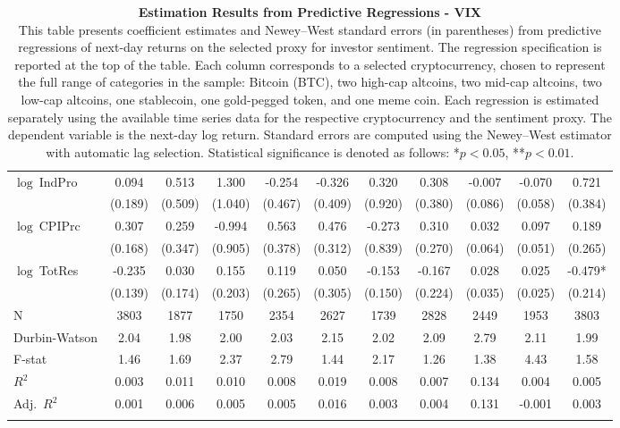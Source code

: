 \begin{table}[ht]
\begin{tabular}{l *{10}{c}}
\addlinespace
$\log\ $IndPro & 0.094 & 0.513 & 1.300 & -0.254 & -0.326 & 0.320 & 0.308 & -0.007 & -0.070 & 0.721 \\
 & (0.189) & (0.509) & (1.040) & (0.467) & (0.409) & (0.920) & (0.380) & (0.086) & (0.058) & (0.384) \\
\addlinespace
$\log\ $CPIPrc & 0.307 & 0.259 & -0.994 & 0.563 & 0.476 & -0.273 & 0.310 & 0.032 & 0.097 & 0.189 \\
 & (0.168) & (0.347) & (0.905) & (0.378) & (0.312) & (0.839) & (0.270) & (0.064) & (0.051) & (0.265) \\
\addlinespace
$\log\ $TotRes & -0.235 & 0.030 & 0.155 & 0.119 & 0.050 & -0.153 & -0.167 & 0.028 & 0.025 & -0.479* \\
 & (0.139) & (0.174) & (0.203) & (0.265) & (0.305) & (0.150) & (0.224) & (0.035) & (0.025) & (0.214) \\
\addlinespace
\midrule
N & 3803 & 1877 & 1750 & 2354 & 2627 & 1739 & 2828 & 2449 & 1953 & 3803 \\
Durbin-Watson & 2.04 & 1.98 & 2.00 & 2.03 & 2.15 & 2.02 & 2.09 & 2.79 & 2.11 & 1.99 \\
F-stat & 1.46 & 1.69 & 2.37 & 2.79 & 1.44 & 2.17 & 1.26 & 1.38 & 4.43 & 1.58 \\
\(R^2\) & 0.003 & 0.011 & 0.010 & 0.008 & 0.019 & 0.008 & 0.007 & 0.134 & 0.004 & 0.005 \\
Adj.\ \(R^2\) & 0.001 & 0.006 & 0.005 & 0.005 & 0.016 & 0.003 & 0.004 & 0.131 & -0.001 & 0.003 \\
\addlinespace
\midrule
\multicolumn{11}{c}{Specification tested: $R_{i,t+1} = \alpha_i + \beta_{sent} S_t + \phi R_{i,t} + \theta B_{i,t} + \gamma M_t + \varepsilon_{i,t+1}$}\\
\bottomrule
\end{tabular}
\caption{\textbf{Estimation Results from Predictive Regressions - VIX} \\
This table presents coefficient estimates and Newey--West standard errors (in parentheses) from predictive regressions of next-day returns on the selected proxy for investor sentiment. The regression specification is reported at the top of the table. Each column corresponds to a selected cryptocurrency, chosen to represent the full range of categories in the sample: Bitcoin (BTC), two high-cap altcoins, two mid-cap altcoins, two low-cap altcoins, one stablecoin, one gold-pegged token, and one meme coin. Each regression is estimated separately using the available time series data for the respective cryptocurrency and the sentiment proxy. The dependent variable is the next-day log return. Standard errors are computed using the Newey--West estimator with automatic lag selection. Statistical significance is denoted as follows: *$p<0.05$, **$p<0.01$.}
\label{tab:vix_result_h1}
\end{table}